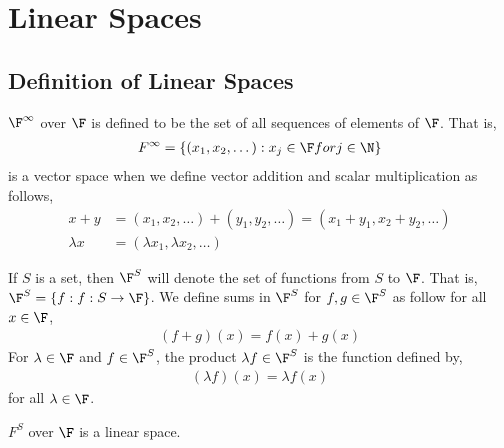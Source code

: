 \documentclass{article}
\begin{document}
\author{Ali Geisa}
\tableofcontents

\section{Linear Spaces}
\subsection{Definition of Linear Spaces}
  \begin{example}
    $\F^\infty$ over $\F$ is defined to be the set of all sequences of elements of $\F$. That is,
    \begin{align*}
      F^{\infty} = \{(x_1, x_2, \dots): x_j \in \F for j \in \N\}
    \end{align*}
    is a vector space when we define vector addition and scalar multiplication as follows,
    \begin{align*}
      x + y & = (x_1, x_2, \dots) + (y_1, y_2, \dots) = (x_1 + y_1, x_2 + y_2, \dots) \\
      \lambda x & = (\lambda x_1, \lambda x_2, \dots)
    \end{align*}
  \end{example}
  \begin{example}
    If $S$ is a set, then $\F^S$ will denote the set of functions from $S$ to $\F$. That is, $\F^S = \{f: f: S \to \F\}$. We define sums in $\F^S$ for $f, g \in \F^S$ as follow
    for all $x \in \F$,
    \begin{align*}
      (f + g)(x) = f(x) + g(x)
    \end{align*}
    For $\lambda \in \F$ and $f \in \F^S$, the product $\lambda f \in \F^S$ is the function defined by,
    \begin{align*}
      (\lambda f)(x) = \lambda f(x)
    \end{align*}
    for all $\lambda \in \F$.
  \end{example}
  \begin{prop}
    $F^S$ over $\F$ is a linear space.
  \end{prop}
\end{document}
